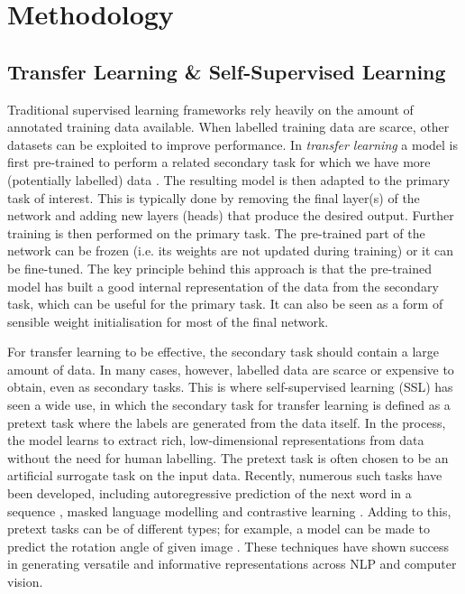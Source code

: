\documentclass[a4paper,12pt]{article}
\begin{document}
\section{Methodology}
\label{sec:methodology}
\subsection{Transfer Learning \& Self-Supervised Learning}
\label{sec:ssl}

Traditional supervised learning frameworks rely heavily on the amount of annotated training data available. When labelled training data are scarce, other datasets can be exploited to improve performance. In \emph{transfer learning} a model is first pre-trained to perform a related secondary task for which we have more (potentially labelled) data \cite{udl}. The resulting model is then adapted to the primary task of interest. This is typically done by removing the final layer(s) of the network and adding new layers (heads) that produce the desired output. Further training is then performed on the primary task. The pre-trained part of the network can be frozen (i.e. its weights are not updated during training) or it can be fine-tuned. The key principle behind this approach is that the pre-trained model has built a good internal representation of the data from the secondary task, which can be useful for the primary task. It can also be seen as a form of sensible weight initialisation for most of the final network.

For transfer learning to be effective, the secondary task should contain a large amount of data. In many cases, however, labelled data are scarce or expensive to obtain, even as secondary tasks. This is where self-supervised learning (SSL) has seen a wide use, in which the secondary task for transfer learning is defined as a  pretext task where the labels are generated from the data itself. In the process, the model learns to extract rich, low-dimensional representations from data without the need for human labelling. The pretext task is often chosen to be an artificial surrogate task on the input data. Recently, numerous such tasks have been developed, including autoregressive prediction of the next word in a sequence \cite{radford2019language}, masked language modelling \cite{devlin2018bert} and contrastive learning \cite{radford2021learning}. Adding to this, pretext tasks can be of different types; for example,  a model can be made to predict the rotation angle of given image \cite{hintonsimpleframework}. These techniques have shown success in generating versatile and informative representations across NLP and computer vision.
\end{document}
